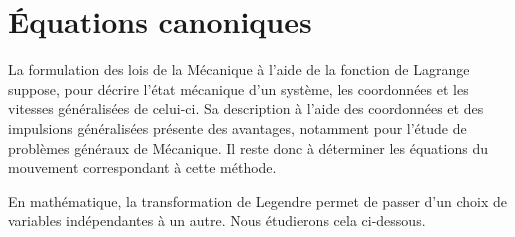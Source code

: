 \chapter{\'{E}quations canoniques}

La formulation des lois de la M\'{e}canique \`{a} l'aide de la fonction de Lagrange suppose, pour d\'{e}crire l'\'{e}tat m\'{e}canique d'un syst\`{e}me, les coordonn\'{e}es et les vitesses g\'{e}n\'{e}ralis\'{e}es de celui-ci. Sa description \`{a} l'aide des coordonn\'{e}es et des impulsions g\'{e}n\'{e}ralis\'{e}es pr\'{e}sente des avantages, notamment pour l'\'{e}tude de probl\`{e}mes g\'{e}n\'{e}raux de M\'{e}canique. Il reste donc \`{a} d\'{e}terminer les \'{e}quations du mouvement correspondant \`{a} cette m\'{e}thode.

En math\'{e}matique, la transformation de Legendre permet de passer d'un choix de variables ind\'{e}pendantes \`{a} un autre. Nous \'{e}tudierons cela ci-dessous.

